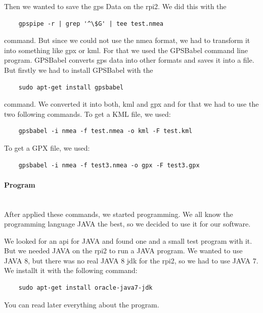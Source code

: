 \newline
Then we wanted to save the \gls{gps} Data on the \gls{rpi2}. We did this with the 
\begin{verbatim}
	gpspipe -r | grep '^\$G' | tee test.nmea 
\end{verbatim}
command.
But since we could not use the \gls{nmea} format, we had to transform it into something like \gls{gpx} or \gls{kml}. For that we used the GPSBabel command line program. GPSBabel converts \gls{gps} data into other formats and saves it into a file. But firstly we had to install GPSBabel with the 
\begin{verbatim}
	sudo apt-get install gpsbabel 
\end{verbatim}
command. We converted it into both, \gls{kml} and \gls{gpx} and for that we had to use the two following commands.
To get a KML file, we used:
\begin{verbatim}
	gpsbabel -i nmea -f test.nmea -o kml -F test.kml
\end{verbatim}
To get a GPX file, we used:
\begin{verbatim}
	gpsbabel -i nmea -f test3.nmea -o gpx -F test3.gpx
\end{verbatim}
\paragraph{Program} \mbox{}\\
After applied these commands, we started programming. We all know the programming language JAVA the best, so we decided to use it for our software.  

We looked for an \gls{api} for JAVA and found one and a small test program with it. \newline
But we needed JAVA on the \gls{rpi2} to run a JAVA program. We wanted to use JAVA 8, but there was no real JAVA 8 \gls{jdk} for the \gls{rpi2}, so we had to use JAVA 7. We installt it with the following command:
\begin{verbatim}
	sudo apt-get install oracle-java7-jdk
\end{verbatim}
You can read later everything about the program.

